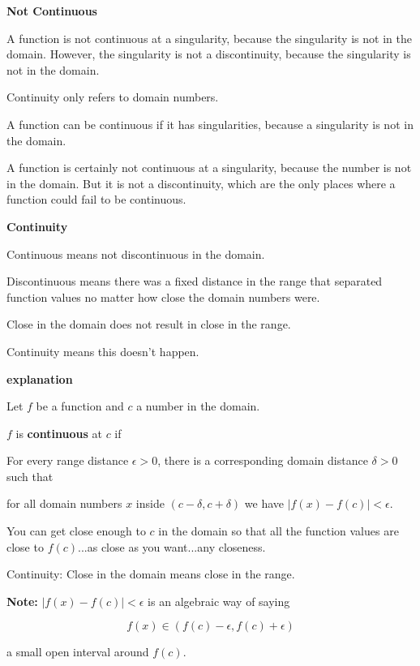 \documentclass{ximera}
\begin{document}
\begin{warning} \textbf{\textcolor{red!70!black}{Not Continuous}}


A function is not continuous at a singularity, because the singularity is not in the domain.  However, the singularity is not a discontinuity, because the singularity is not in the domain. 

Continuity only refers to domain numbers.

A function can be continuous if it has singularities, because a singularity is not in the domain.

A function is certainly not continuous at a singularity, because the number is not in the domain. But it is not a discontinuity, which are the only places where a function could fail to be continuous.



\end{warning}





\begin{idea} \textbf{\textcolor{blue!55!black}{Continuity}}


Continuous means not discontinuous in the domain. 

Discontinuous means there was a fixed distance in the range that separated function values no matter how close the domain numbers were. 

Close in the domain does not result in close in the range.

Continuity means this doesn't happen. 

\textbf{\textcolor{red!75!green}{explanation}} 

Let $f$ be a function and $c$ a number in the domain. 

$f$ is \textbf{continuous} at $c$ if  


For every range distance $\epsilon > 0 $, there is a corresponding domain distance $\delta > 0$ such that 


for all domain numbers $x$ inside $(c - \delta, c + \delta)$ we have $| f(x) - f(c) | < \epsilon$. 





You can get close enough to $c$ in the domain so that all the function values are close to $f(c)$...as close as you want...any closeness. 



Continuity: Close in the domain means close in the range.


\textbf{Note:} $| f(x) - f(c) | < \epsilon$ is an algebraic way of saying  

\[  f(x) \in (f(c) - \epsilon, f(c) + \epsilon)  \]

a small open interval around $f(c)$.



\end{idea}
\end{document}

